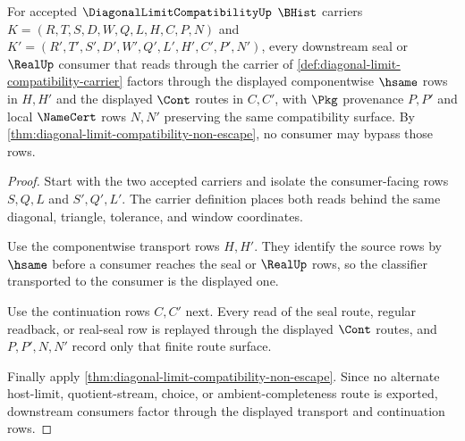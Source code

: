 \begin{theorem}
\label{thm:diagonal-limit-compatibility-consumer-transport}
For accepted $\DiagonalLimitCompatibilityUp$ $\BHist$ carriers
$K=(R,T,S,D,W,Q,L,H,C,P,N)$ and
$K'=(R',T',S',D',W',Q',L',H',C',P',N')$, every downstream seal or
$\RealUp$ consumer that reads through the carrier of
\autoref{def:diagonal-limit-compatibility-carrier} factors through the
displayed componentwise $\hsame$ rows in $H,H'$ and the displayed $\Cont$
routes in $C,C'$, with $\Pkg$ provenance $P,P'$ and local $\NameCert$ rows
$N,N'$ preserving the same compatibility surface. By
\autoref{thm:diagonal-limit-compatibility-non-escape}, no consumer may bypass
those rows.
\end{theorem}
\begin{proof}
Start with the two accepted carriers and isolate the consumer-facing rows
$S,Q,L$ and $S',Q',L'$. The carrier definition places both reads behind the
same diagonal, triangle, tolerance, and window coordinates.

Use the componentwise transport rows $H,H'$. They identify the source rows by
$\hsame$ before a consumer reaches the seal or $\RealUp$ rows, so the
classifier transported to the consumer is the displayed one.

Use the continuation rows $C,C'$ next. Every read of the seal route, regular
readback, or real-seal row is replayed through the displayed $\Cont$ routes,
and $P,P',N,N'$ record only that finite route surface.

Finally apply \autoref{thm:diagonal-limit-compatibility-non-escape}. Since no
alternate host-limit, quotient-stream, choice, or ambient-completeness route is
exported, downstream consumers factor through the displayed transport and
continuation rows.
\end{proof}

